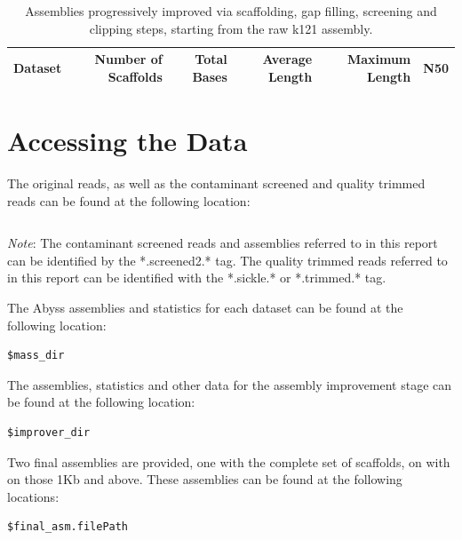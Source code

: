 \documentclass{amsart}
\begin{document}
\begin{table}[H]
\begin{tabular}{lrrrrr}
\toprule
Dataset & Number of Scaffolds & Total Bases & Average Length & Maximum Length & N50 \\
\midrule
\bottomrule
\end{tabular}
\caption{Assemblies progressively improved via scaffolding, gap filling, screening and clipping steps, starting from the raw k121 assembly.  }
\label{tab:scaffold-stats}
\end{table}


\newpage
\section{Accessing the Data}


The original reads, as well as the contaminant screened and quality trimmed reads can be found at the following location:

\begin{lstlisting}[label=path:1]
\end{lstlisting}

\emph{Note}: The contaminant screened reads and assemblies referred to in this report can be identified by the *.screened2.* tag.  The quality trimmed reads referred to in this report can be identified with the *.sickle.* or *.trimmed.* tag.

The Abyss assemblies and statistics for each dataset can be found at the following location:

\begin{lstlisting}[label=path:1]
$mass_dir
\end{lstlisting}


The assemblies, statistics and other data for the assembly improvement stage can be found at the following location:

\begin{lstlisting}[label=path:1]
$improver_dir
\end{lstlisting} 


Two final assemblies are provided, one with the complete set of scaffolds, on with on those 1Kb and above.  These assemblies can be found at the following locations:

\begin{lstlisting}[label=path:1]
$final_asm.filePath
\end{lstlisting}
\end{document}
